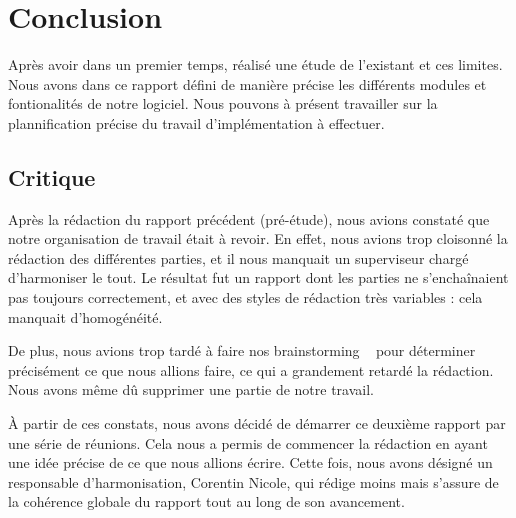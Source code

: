 \section{Conclusion}

	
	Après avoir dans un premier temps, réalisé une étude de l'existant et ces limites. Nous avons dans ce rapport défini de manière précise les différents modules et fontionalités de notre logiciel. Nous pouvons à présent travailler sur la plannification précise du travail d'implémentation à effectuer. 

	\subsection{Critique}
	Après la rédaction du rapport précédent (pré-étude), nous avions constaté que notre organisation de travail était à revoir. 
	En effet, nous avions trop cloisonné la rédaction des différentes parties, et il nous manquait un superviseur chargé d'harmoniser le tout.
	Le résultat fut un rapport dont les parties ne s'enchaînaient pas toujours correctement, et avec des styles de rédaction très variables : cela manquait d'homogénéité.

	De plus, nous avions trop tardé à faire nos \og brainstorming \fg~ pour déterminer précisément ce que nous allions faire, ce qui a grandement retardé la rédaction. Nous avons même dû supprimer une partie de notre travail.

	À partir de ces constats, nous avons décidé de démarrer ce deuxième rapport par une série de réunions. Cela nous a permis de commencer la rédaction en ayant une idée précise de ce que nous allions écrire.
	Cette fois, nous avons désigné un responsable d'harmonisation, Corentin Nicole, qui rédige moins mais s'assure de la cohérence globale du rapport tout au long de son avancement.
